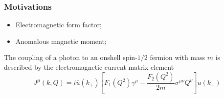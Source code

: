  \begin{frame}\frametitle{Motivations}



\begin{itemize}
	\item Electromagnetic form factor;
	\item Anomalous magnetic moment;
\end{itemize}
\vspace{2mm}

The coupling of a photon to an onshell spin-$1/2$ fermion with mass $m$ is described by the electromagnetic
current matrix element
\begin{equation}
	J^\mu(k, Q)=i\bar{u}(k_+)\left[F_1(Q^2)\gamma^\mu-\frac{F_2(Q^2)}{2m}\sigma^{\mu\nu}Q^\nu\right]u(k_-)
\end{equation}

\end{frame}

\endinput
